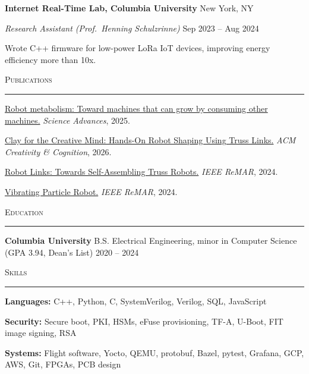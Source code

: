 \documentclass[11pt, letterpaper]{article}
\newcommand{\link}[2]{\href{#1}{\textcolor{linkink}{#2}}}
\newcommand{\sectionhead}[1]{%
  \par\vspace{4pt}%
  {\large\scshape #1}\par
  \vspace{-6pt}\rule{\linewidth}{0.4pt}\par
  \vspace{1pt}}
\newcommand{\role}[4]{%
  \par\vspace{3pt}%
  \textbf{#1} \hfill #2\par
  \textit{#3} \hfill #4\par}
\newenvironment{bullets}{%
  \begin{list}{\textbullet}{%
    \setlength{\leftmargin}{1.1em}%
    \setlength{\labelsep}{0.45em}%
    \setlength{\labelwidth}{0.65em}%
    \setlength{\itemsep}{0.5pt}%
    \setlength{\parsep}{0pt}%
    \setlength{\topsep}{1.5pt}%
    \setlength{\partopsep}{0pt}}}%
  {\end{list}}
\newcommand{\meta}[1]{{\small #1}}
\begin{document}
\role{Internet Real-Time Lab, Columbia University}{New York, NY}{Research Assistant \meta{(Prof.\ Henning Schulzrinne)}}{Sep 2023 -- Aug 2024}
\begin{bullets}
  \item Wrote C++ firmware for low-power LoRa IoT devices, improving energy efficiency more than 10x.
\end{bullets}

\sectionhead{Publications}

\begin{bullets}
  \item \link{https://www.science.org/doi/10.1126/sciadv.adu6897}{Robot metabolism: Toward machines that can grow by consuming other machines.}
        \textit{Science Advances}, 2025.
  \item \link{https://dl.acm.org/doi/10.1145/3803784.3816836}{Clay for the Creative Mind: Hands-On Robot Shaping Using Truss Links.}
        \textit{ACM Creativity \& Cognition}, 2026.
  \item \link{https://ieeexplore.ieee.org/document/10619984}{Robot Links: Towards Self-Assembling Truss Robots.}
        \textit{IEEE ReMAR}, 2024.
  \item \link{https://ieeexplore.ieee.org/document/10619983}{Vibrating Particle Robot.}
        \textit{IEEE ReMAR}, 2024.
\end{bullets}

\sectionhead{Education}

\par\vspace{4pt}%
\textbf{Columbia University} \enspace B.S. Electrical Engineering, minor in Computer Science
\meta{(GPA 3.94, Dean's List)} \hfill 2020 -- 2024\par

\sectionhead{Skills}

\textbf{Languages:} C++, Python, C, SystemVerilog, Verilog, SQL, JavaScript\par
\textbf{Security:} Secure boot, PKI, HSMs, eFuse provisioning, TF-A, U-Boot, FIT image signing, RSA\par
\textbf{Systems:} Flight software, Yocto, QEMU, protobuf, Bazel, pytest, Grafana, GCP, AWS, Git, FPGAs, PCB design
\end{document}
